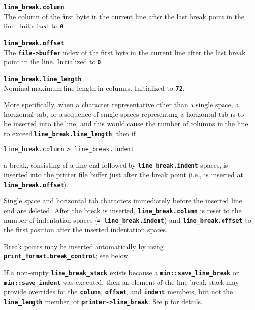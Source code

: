 \documentclass[12pt]{article}
\makeatletter
\newcommand{\TT}[1]{{\tt \bfseries #1}}
\newcommand{\ttmkey}[2]{\TT{#1}\index{#1@{\tt #1}!#2}}
\newcommand{\pagref}[1]{p\pageref{#1}}
\newcommand{\EOL}{\penalty \exhyphenpenalty}
\newenvironment{itemlist}[1][1.2in]%
	{\begin{list}{}{\setlength{\labelwidth}{#1}%
		        \setlength{\leftmargin}{\labelwidth}%
		        \addtolength{\leftmargin}{+0.2in}%
		        \renewcommand{\makelabel}[1]{##1\hfill}}}%
	{\end{list}}
\makeatother
\begin{document}
\begin{itemlist}[0.6in]

\item[\ttmkey{line\_\EOL break.column}{in {\tt min::printer}}]~\\
The column of the
first byte in the current line after the last break point in the line.
Initialized to \TT{0}.

\item[\ttmkey{line\_\EOL break.offset}{in {\tt min::printer}}]~\\
The \TT{file->buffer} index of the
first byte in the current line after the last break point in the line.
Initialized to \TT{0}.

\item[\ttmkey{line\_\EOL break.line\_length}{in {\tt min::printer}}]%
\label{LINE-LENGTH}~\\
Nominal maximum line length in columns.  Initialized to \TT{72}.

More specifically,
when a character representative other than a single space, a horizontal
tab, or a sequence of single spaces representing a horizontal tab
is to be inserted into the line, and this would cause the number
of columns in the line to exceed \TT{line\_\EOL break.line\_length}, then if
\begin{center}
\tt line\_break.column > line\_break.indent
\end{center}
a break, consisting of a line end followed by \TT{line\_break.indent}
spaces,
is inserted into the printer file buffer just after the break point
(i.e., is inserted at \TT{line\_\EOL break.offset}).

Single space and horizontal tab
characters immediately before the inserted line end are deleted.
After the break is inserted, \TT{line\_\EOL break.column} is reset to
the number of indentation spaces (\TT{= line\_\EOL break.indent})
and \TT{line\_\EOL break.offset} to the first position after
the inserted indentation spaces.

Break points may be inserted automatically by using
\TT{print\_format.break\_con\-trol}; see below.

If a non-empty \TT{line\_break\_stack} exists
because a \TT{min::\EOL save\_\EOL line\_\EOL break} or 
\TT{min::\EOL save\_\EOL indent} was executed,
then an element of the line break stack may provide overrides for the
\TT{column}, \TT{offset}, and
\TT{indent} members, but not the \TT{line\_\EOL length} member,
of \TT{printer->\EOL line\_\EOL break}.
See \pagref{LINE-BREAK-STACK} for details.


\end{itemlist}
\end{document}
